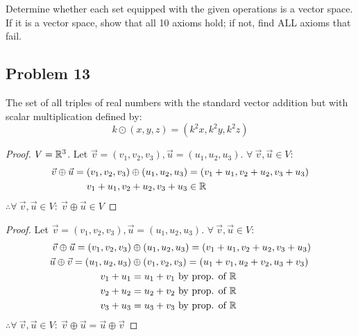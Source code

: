 




Determine whether each set equipped with the given operations is a vector space.
If it is a vector space, show that all 10 axioms hold; if not, find ALL axioms that fail.

\subsection*{Problem 13}
The set of all triples of real numbers with the standard vector addition but with scalar multiplication defined by:
\[
  k \odot (x,y,z) = (k^2x,k^2y,k^2z)
\]
\begin{enumerate}
  \begin{proof}
    $V = \mathbb{R}^3$. Let $\vec{v}=(v_1,v_2,v_3),\vec{u}=(u_1,u_2,u_3)$. $\forall~\vec{v},\vec{u} \in V$:
    \begin{align*}
      \vec{v} \oplus \vec{u} = (v_1,v_2,v_3) \oplus (u_1,u_2,u_3) & = (v_1+u_1,v_2+u_2,v_3+u_3) \\
      v_1+u_1,v_2+u_2,v_3+u_3                                     & \in \mathbb{R}                  \\
    \end{align*}
    $\therefore \forall~\vec{v},\vec{u} \in V:~\vec{v} \oplus \vec{u} \in V$
  \end{proof}
  \begin{proof}
    Let $\vec{v}=(v_1,v_2,v_3),\vec{u}=(u_1,u_2,u_3)$. $\forall~\vec{v},\vec{u} \in V$:
    \begin{align*}
      \vec{v} \oplus \vec{u} = (v_1,v_2,v_3) & \oplus (u_1,u_2,u_3) = (v_1+u_1,v_2+u_2,v_3+u_3) \\
      \vec{u} \oplus \vec{v} = (u_1,u_2,u_3) & \oplus (v_1,v_2,v_3) = (u_1+v_1,u_2+v_2,u_3+v_3) \\
      v_1+u_1                                & = u_1+v_1~\text{by prop. of}~\mathbb{R}              \\
      v_2+u_2                                & = u_2+v_2~\text{by prop. of}~\mathbb{R}              \\
      v_3+u_3                                & = u_3+v_3~\text{by prop. of}~\mathbb{R}
    \end{align*}
    $\therefore \forall~\vec{v},\vec{u} \in V:~\vec{v} \oplus \vec{u} = \vec{u} \oplus \vec{v}$
  \end{proof}

\end{enumerate}
